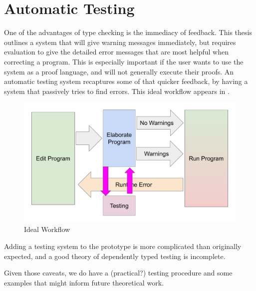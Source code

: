 \section{Automatic Testing}

One of the advantages of type checking is the immediacy of feedback.
This thesis outlines a system that will give warning messages immediately, but requires evaluation to give the detailed error messages that are most helpful when correcting a program.
This is especially important if the user wants to use the system as a proof language, and will not generally execute their proofs.
An automatic testing system recaptures some of that quicker feedback, by having a system that passively tries to find errors.
This ideal workflow appears in .


\begin{figure}
\includegraphics[width=5in]{fig/best-workflow.pdf}
\caption{Ideal Workflow}
\label{fig:notes-workflow}
\end{figure}
 
Adding a testing system to the prototype is more complicated than originally expected, and a good theory of dependently typed testing is incomplete.
 
Given those caveats, we do have a (practical?) testing procedure and some examples that might inform future theoretical work.
 
